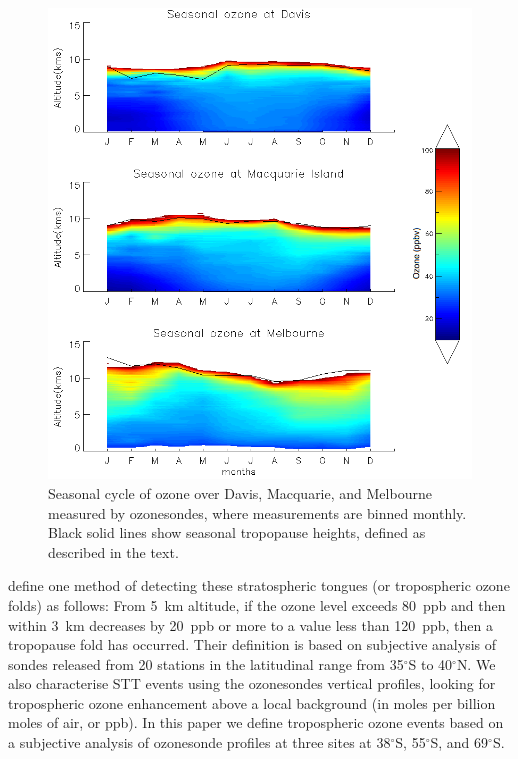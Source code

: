 \documentclass{article}
\begin{document}
    \begin{figure}[!htbp]
      \begin{center}
      \includegraphics[width=0.8\columnwidth]{figures/seasonaltropozone}
      \caption{
      Seasonal cycle of ozone over Davis, Macquarie, and Melbourne measured by ozonesondes, where measurements are binned monthly.
      Black solid lines show seasonal tropopause heights, defined as described in the text.
      }
      \label{fig:seasonaltropozone}
      \end{center}
    \end{figure}
    

    \citet{Tang2010} define one method of detecting these stratospheric tongues (or tropospheric ozone folds)  as follows: From 5~km altitude, if the ozone level exceeds 80~ppb and then within 3~km decreases by 20~ppb or more to a value less than 120~ppb, then a tropopause fold has occurred.
    Their definition is based on subjective analysis of sondes released from 20 stations in the latitudinal range from 35$^\circ$S to 40$^\circ$N.
    We also characterise STT events using the ozonesondes vertical profiles, looking for tropospheric ozone enhancement above a local background (in moles per billion moles of air, or ppb).
    In this paper we define tropospheric ozone events based on a subjective analysis of ozonesonde profiles at three sites at 38$^\circ$S, 55$^\circ$S, and 69$^\circ$S.
    
\end{document}
